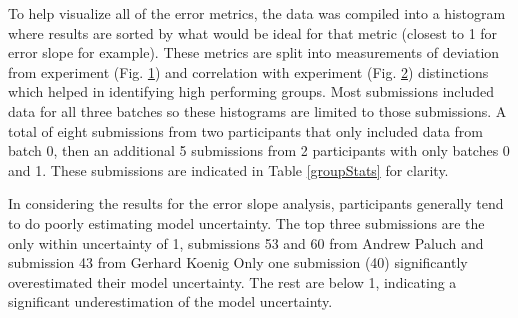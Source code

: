 \begin{figure} %
\caption{}
\label{histogramsAverage}       %
\end{figure}

\begin{figure} %
\caption{}
\label{histogramsCorrelations}       %
\end{figure}

To help visualize all of the error metrics, the data was compiled into a histogram where results are sorted by what would be ideal for that metric (closest to 1 for error slope for example). 
These metrics are split into measurements of deviation from experiment (Fig. \ref{histogramsAverage}) and correlation with experiment (Fig. \ref{histogramsCorrelations}) distinctions which helped in identifying high performing groups. 
Most submissions included data for all three batches so these histograms are limited to those submissions. 
A total of eight submissions from two participants that only included data from batch 0, then an additional 5 submissions from 2 participants with only batches 0 and 1.
These submissions are indicated in Table \ref{groupStats} for clarity.

In considering the results for the error slope analysis, participants generally tend to do poorly estimating model uncertainty. 
The top three submissions are the only within uncertainty of 1, submissions 53 and 60 from Andrew Paluch %
and submission 43 from Gerhard Koenig %
Only one submission (40) significantly overestimated their model uncertainty. 
The rest are below 1, indicating a significant underestimation of the model uncertainty. 

